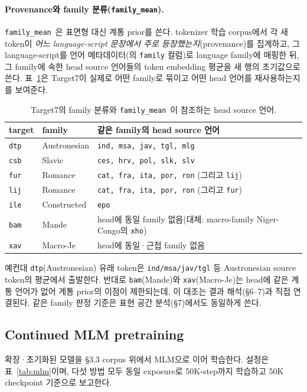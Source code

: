 \documentclass[11pt,a4paper]{article}
\newcommand{\famm}{\texttt{family\_mean}}
\begin{document}
\paragraph{Provenance와 family 분류(\famm).} \famm\ 은 표면형 대신 계통 prior를 쓴다. tokenizer 학습 corpus에서 각 새 token이 \emph{어느 language-script 문장에서 주로 등장했는지}(provenance)를 집계하고, 그 language-script를 언어 메타데이터(의 \texttt{family} 컬럼)로 language family에 매핑한 뒤, 그 family에 속한 head source 언어들의 token embedding 평균을 새 행의 초기값으로 쓴다. 표~\ref{tab:fam}은 Target7이 실제로 어떤 family로 묶이고 어떤 head 언어를 재사용하는지를 보여준다.

\begin{table}[H]\centering\small
\caption{Target7의 family 분류와 \famm\ 이 참조하는 head source 언어.}
\label{tab:fam}
\begin{tabular}{@{}lll@{}}
\toprule
target & family & 같은 family의 head source 언어 \\
\midrule
\texttt{dtp} & Austronesian & \texttt{ind, msa, jav, tgl, mlg} \\
\texttt{csb} & Slavic & \texttt{ces, hrv, pol, slk, slv} \\
\texttt{fur} & Romance & \texttt{cat, fra, ita, por, ron} (그리고 \texttt{lij}) \\
\texttt{lij} & Romance & \texttt{cat, fra, ita, por, ron} (그리고 \texttt{fur}) \\
\texttt{ile} & Constructed & \texttt{epo} \\
\texttt{bam} & Mande & head에 동일 family 없음(대체: macro-family Niger-Congo의 \texttt{xho}) \\
\texttt{xav} & Macro-Je & head에 동일·근접 family 없음 \\
\bottomrule
\end{tabular}
\end{table}

예컨대 \texttt{dtp}(Austronesian) 유래 token은 \texttt{ind/msa/jav/tgl} 등 Austronesian source token의 평균에서 출발한다. 반대로 \texttt{bam}(Mande)와 \texttt{xav}(Macro-Je)는 head에 같은 계통 언어가 없어 계통 prior의 이점이 제한되는데, 이 대조는 결과 해석(\S6--7)과 직접 연결된다. 같은 family 판정 기준은 표현 공간 분석(\S7)에서도 동일하게 쓴다.

\subsection{Continued MLM pretraining}
확장·초기화된 모델을 \S3.3 corpus 위에서 MLM으로 이어 학습한다. 설정은 표~\ref{tab:mlm}이며, 다섯 방법 모두 동일 exposure로 50K-step까지 학습하고 50K checkpoint 기준으로 보고한다.
\end{document}
